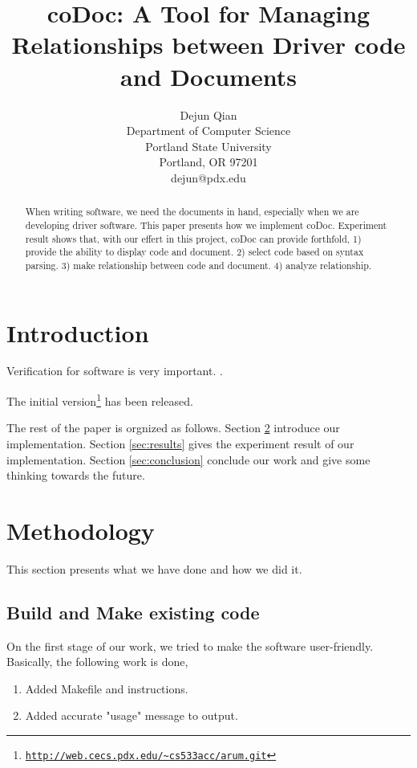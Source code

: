 \documentclass[11pt,letterpaper,oneside]{article}
\title{coDoc: A Tool for Managing Relationships between Driver code and Documents}
\author{Dejun Qian\\Department of Computer Science\\Portland State University\\Portland, OR 97201\\dejun@pdx.edu}
\begin{document}
\maketitle

\begin{abstract}
When writing software, 
we need the documents in hand, 
especially when we are developing driver software.
This paper presents how we implement coDoc. 
Experiment result shows that, with our effert in this project, coDoc can provide forthfold, 
1) provide the ability to display code and document. 
2) select code based on syntax parsing.
3) make relationship between code and document.
4) analyze relationship.
\end{abstract}

\section{Introduction}
\label{sec:introduction}
Verification for software is very important. \cite{xiao_automated_2012}.

The initial version\footnote{\texttt{\url{http://web.cecs.pdx.edu/~cs533acc/arum.git}}} has been released.

The rest of the paper is orgnized as follows. 
Section \ref{sec:methodology} introduce our implementation.
Section \ref{sec:results} gives the experiment result of our implementation. 
Section \ref{sec:conclusion} conclude our work and give some thinking towards the future.

\section{Methodology}
\label{sec:methodology}
This section presents what we have done and how we did it.

\subsection{Build and Make existing code}
On the first stage of our work, we tried to make the software user-friendly. Basically, the following work is done,
\begin{enumerate}
\item Added Makefile and instructions.
\item Added accurate "usage" message to output.
\end{enumerate}
\end{document}
